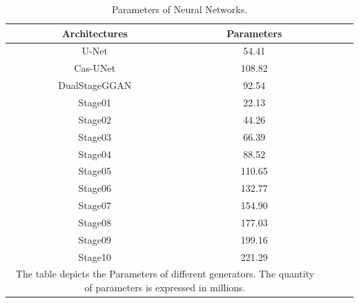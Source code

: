\documentclass[a4paper, times, 10pt,twocolumn]{article}
\begin{document}
\begin{table}[h]
	\centering
	\caption{Parameters of Neural Networks.}
	\label{tab:model_parameters}
	\begin{tabular}{ccccc}
		\hline
		Architectures                                                   & Parameters \\
		\hline
		U-Net\cite{navab_u-net_2015}                                    & 54.41      \\
		Cas-UNet\cite{zeng_swin-casunet_2022}                           & 108.82     \\
		DualStageGGAN\cite{wang_dsg-gandual-stage-generator-based_2024} & 92.54      \\
		Stage01                                                         & 22.13      \\
		Stage02                                                         & 44.26      \\
		Stage03                                                         & 66.39      \\
		Stage04                                                         & 88.52      \\
		Stage05                                                         & 110.65     \\
		Stage06                                                         & 132.77     \\
		Stage07                                                         & 154.90     \\
		Stage08                                                         & 177.03     \\
		Stage09                                                         & 199.16     \\
		Stage10                                                         & 221.29     \\
		\hline
		\multicolumn{2}{p{201pt}}{The table depicts the Parameters of different generators. The quantity of parameters is expressed in millions.}
	\end{tabular}
\end{table}

\end{document}

